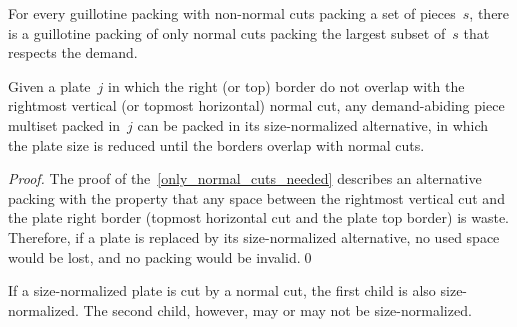 \begin{theorem}\label{only_normal_cuts_needed}
For every guillotine packing with non-normal cuts packing a set of pieces~\(s\), there is a guillotine packing of only normal cuts packing the largest subset of~\(s\) that respects the demand.
\end{theorem}


\begin{corollary}\label{co:size_normalized_plate}
Given a plate~\(j\) in which the right (or top) border do not overlap with the rightmost vertical (or topmost horizontal) normal cut, any demand-abiding piece multiset packed in~\(j\) can be packed in its size-normalized alternative, in which the plate size is reduced until the borders overlap with normal cuts.
\end{corollary}

\begin{proof}
The proof of the~\autoref{only_normal_cuts_needed} describes an alternative packing with the property that any space between the rightmost vertical cut and the plate right border (topmost horizontal cut and the plate top border) is waste. Therefore, if a plate is replaced by its size-normalized alternative, no used space would be lost, and no packing would be invalid.\qed
\end{proof}

\begin{remark}
If a size-normalized plate is cut by a normal cut, the first child is also size-normalized. The second child, however, may or may not be size-normalized.
\end{remark}



